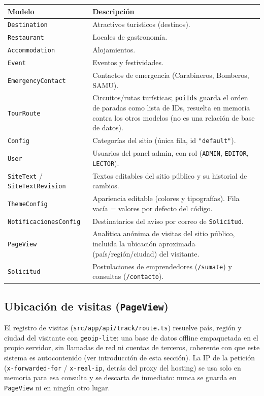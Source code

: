 \documentclass[11pt,a4paper]{article}
\begin{document}
\begin{longtable}{p{4cm}p{10cm}}
\toprule
\textbf{Modelo} & \textbf{Descripción} \\
\midrule
\endhead
\texttt{Destination} & Atractivos turísticos (destinos). \\
\texttt{Restaurant} & Locales de gastronomía. \\
\texttt{Accommodation} & Alojamientos. \\
\texttt{Event} & Eventos y festividades. \\
\texttt{EmergencyContact} & Contactos de emergencia (Carabineros, Bomberos, SAMU). \\
\texttt{TourRoute} & Circuitos/rutas turísticas; \texttt{poiIds} guarda el orden de paradas como lista de IDs, resuelta en memoria contra los otros modelos (no es una relación de base de datos). \\
\texttt{Config} & Categorías del sitio (única fila, id \texttt{"default"}). \\
\texttt{User} & Usuarios del panel admin, con rol (\texttt{ADMIN}, \texttt{EDITOR}, \texttt{LECTOR}). \\
\texttt{SiteText} / \texttt{SiteTextRevision} & Textos editables del sitio público y su historial de cambios. \\
\texttt{ThemeConfig} & Apariencia editable (colores y tipografías). Fila vacía = valores por defecto del código. \\
\texttt{NotificacionesConfig} & Destinatarios del aviso por correo de \texttt{Solicitud}. \\
\texttt{PageView} & Analítica anónima de visitas del sitio público, incluida la ubicación aproximada (país/región/ciudad) del visitante. \\
\texttt{Solicitud} & Postulaciones de emprendedores (\texttt{/sumate}) y consultas (\texttt{/contacto}). \\
\bottomrule
\end{longtable}

\subsection{Ubicación de visitas (\texttt{PageView})}

El registro de visitas (\texttt{src/app/api/track/route.ts}) resuelve país, región y ciudad del visitante con \texttt{geoip-lite}: una base de datos offline empaquetada en el propio servidor, sin llamadas de red ni cuentas de terceros, coherente con que este sistema es autocontenido (ver introducción de esta sección). La IP de la petición (\texttt{x-forwarded-for} / \texttt{x-real-ip}, detrás del proxy del hosting) se usa solo en memoria para esa consulta y se descarta de inmediato: nunca se guarda en \texttt{PageView} ni en ningún otro lugar.
\end{document}
